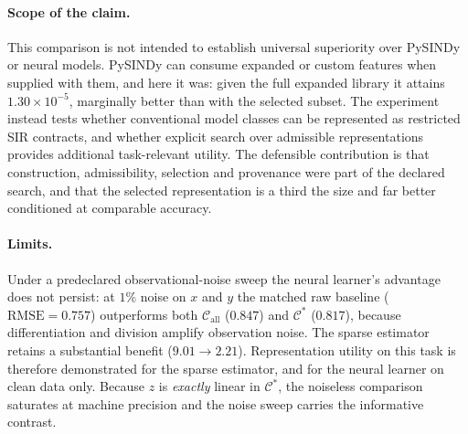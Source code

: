 \paragraph{Scope of the claim.}
This comparison is not intended to establish universal superiority over PySINDy
or neural models. PySINDy can consume expanded or custom features when supplied
with them, and here it was: given the full expanded library it attains
$1.30\times10^{-5}$, marginally better than with the selected subset. The
experiment instead tests whether conventional model classes can be represented as
restricted SIR contracts, and whether explicit search over admissible
representations provides additional task-relevant utility. The defensible
contribution is that construction, admissibility, selection and provenance were
part of the declared search, and that the selected representation is a third the
size and far better conditioned at comparable accuracy.

\paragraph{Limits.}
Under a predeclared observational-noise sweep the neural learner's advantage does
not persist: at $1\%$ noise on $x$ and $y$ the matched raw baseline
($\mathrm{RMSE}=0.757$) outperforms both $\mathcal{C}_{\mathrm{all}}$ ($0.847$)
and $\mathcal{C}^{*}$ ($0.817$), because differentiation and division amplify
observation noise. The sparse estimator retains a substantial benefit
($9.01\rightarrow2.21$). Representation utility on this task is therefore
demonstrated for the sparse estimator, and for the neural learner on clean data
only. Because $z$ is \emph{exactly} linear in $\mathcal{C}^{*}$, the noiseless
comparison saturates at machine precision and the noise sweep carries the
informative contrast.
